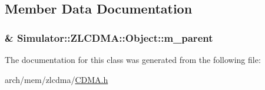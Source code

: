 \subsection{Member Data Documentation}
\hypertarget{class_simulator_1_1_z_l_c_d_m_a_1_1_object_a749358a54d455b727ed7043a582560fa}{
\subsubsection[{m\+\_\+parent}]{\& Simulator\+::\+Z\+L\+C\+D\+M\+A\+::\+Object\+::m\+\_\+parent\hspace{0.3cm}{\ttfamily [protected]}}}\label{class_simulator_1_1_z_l_c_d_m_a_1_1_object_a749358a54d455b727ed7043a582560fa}


The documentation for this class was generated from the following file\+:\begin{DoxyCompactItemize}
\item 
arch/mem/zlcdma/\hyperlink{zlcdma_2_c_d_m_a_8h}{C\+D\+M\+A.\+h}\end{DoxyCompactItemize}
